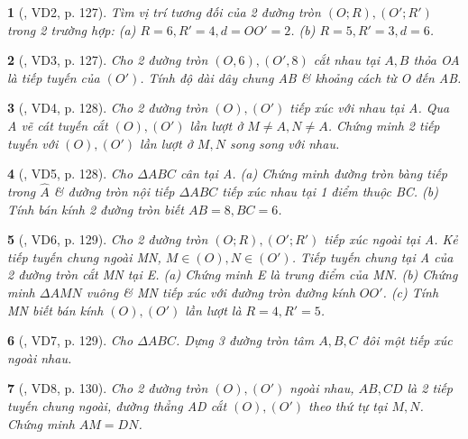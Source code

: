 \documentclass{article}
\newtheorem{baitoan}{}
\begin{document}
\begin{baitoan}[\cite{Binh_boi_duong_Toan_9_tap_1}, VD2, p. 127]
	Tìm vị trí tương đối của 2 đường tròn $(O;R),(O';R')$ trong 2 trường hợp: (a) $R = 6,R' = 4,d = OO' = 2$. (b) $R = 5,R' = 3,d = 6$.
\end{baitoan}

\begin{baitoan}[\cite{Binh_boi_duong_Toan_9_tap_1}, VD3, p. 127]
	Cho 2 đường tròn $(O,6),(O',8)$ cắt nhau tại $A,B$ thỏa OA là tiếp tuyến của $(O')$. Tính độ dài dây chung AB \& khoảng cách từ O đến AB.
\end{baitoan}

\begin{baitoan}[\cite{Binh_boi_duong_Toan_9_tap_1}, VD4, p. 128]
	 Cho 2 đường tròn $(O),(O')$ tiếp xúc với nhau tại A. Qua A vẽ cát tuyến cắt $(O),(O')$ lần lượt ở $M\ne A,N\ne A$. Chứng minh 2 tiếp tuyến với $(O),(O')$ lần lượt ở $M,N$ song song với nhau.
\end{baitoan}

\begin{baitoan}[\cite{Binh_boi_duong_Toan_9_tap_1}, VD5, p. 128]
	Cho $\Delta ABC$ cân tại A. (a) Chứng minh đường tròn bàng tiếp trong $\widehat{A}$ \& đường tròn nội tiếp $\Delta ABC$ tiếp xúc nhau tại 1 điểm thuộc BC. (b) Tính bán kính 2 đường tròn biết $AB = 8,BC = 6$.
\end{baitoan}

\begin{baitoan}[\cite{Binh_boi_duong_Toan_9_tap_1}, VD6, p. 129]
	Cho 2 đường tròn $(O;R),(O';R')$ tiếp xúc ngoài tại A. Kẻ tiếp tuyến chung ngoài MN, $M\in(O),N\in(O')$. Tiếp tuyến chung tại A của 2 đường tròn cắt MN tại E. (a) Chứng minh E là trung điểm của MN. (b) Chứng minh $\Delta AMN$ vuông \& MN tiếp xúc với đường tròn đường kính $OO'$. (c) Tính MN biết bán kính $(O),(O')$ lần lượt là $R = 4,R' = 5$.
\end{baitoan}

\begin{baitoan}[\cite{Binh_boi_duong_Toan_9_tap_1}, VD7, p. 129]
	Cho $\Delta ABC$. Dựng 3 đường tròn tâm $A,B,C$ đôi một tiếp xúc ngoài nhau.
\end{baitoan}

\begin{baitoan}[\cite{Binh_boi_duong_Toan_9_tap_1}, VD8, p. 130]
	Cho 2 đường tròn $(O),(O')$ ngoài nhau, $AB,CD$ là 2 tiếp tuyến chung ngoài, đường thẳng AD cắt $(O),(O')$ theo thứ tự tại $M,N$. Chứng minh $AM = DN$.
\end{baitoan}
\end{document}
